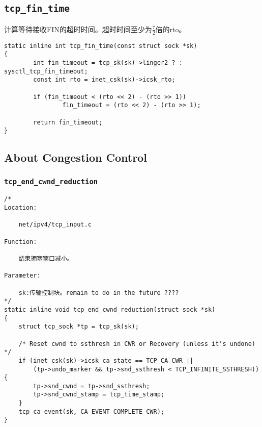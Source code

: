 \subsection{\texttt{tcp_fin_time}}
计算等待接收FIN的超时时间。超时时间至少为$\frac{7}{2}$倍的rto。
\begin{verbatim}
static inline int tcp_fin_time(const struct sock *sk)
{
        int fin_timeout = tcp_sk(sk)->linger2 ? : sysctl_tcp_fin_timeout;
        const int rto = inet_csk(sk)->icsk_rto;

        if (fin_timeout < (rto << 2) - (rto >> 1))
                fin_timeout = (rto << 2) - (rto >> 1);

        return fin_timeout;
}
\end{verbatim}
    \subsection{About Congestion Control}
        \subsubsection{\texttt{tcp_end_cwnd_reduction}}
\begin{verbatim}
/* 
Location:

    net/ipv4/tcp_input.c

Function:

    结束拥塞窗口减小。

Parameter:

    sk:传输控制块。remain to do in the future ????
*/
static inline void tcp_end_cwnd_reduction(struct sock *sk)
{
    struct tcp_sock *tp = tcp_sk(sk);

    /* Reset cwnd to ssthresh in CWR or Recovery (unless it's undone) */
    if (inet_csk(sk)->icsk_ca_state == TCP_CA_CWR ||
        (tp->undo_marker && tp->snd_ssthresh < TCP_INFINITE_SSTHRESH)) {
        tp->snd_cwnd = tp->snd_ssthresh;
        tp->snd_cwnd_stamp = tcp_time_stamp;
    }
    tcp_ca_event(sk, CA_EVENT_COMPLETE_CWR);
}
\end{verbatim}
